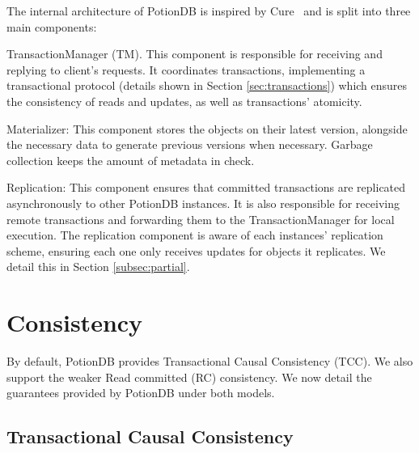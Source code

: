 \documentclass[sigconf, nonacm]{acmart}
\begin{document}
The internal architecture of PotionDB is inspired by Cure~\cite{cure} and is split into three main components:

\begin{compactitem}
	\item TransactionManager (TM). This component is responsible for receiving and replying to client's requests.
	It coordinates transactions, implementing a transactional protocol (details shown in Section \ref{sec:transactions}) which ensures the consistency of reads and updates, as well as transactions' atomicity.
	\item Materializer: This component stores the objects on their latest version, alongside the necessary data to generate previous versions when necessary.
	Garbage collection keeps the amount of metadata in check.
	\item Replication: This component ensures that committed transactions are replicated asynchronously to other PotionDB instances.
	It is also responsible for receiving remote transactions and forwarding them to the TransactionManager for local execution.
	The replication component is aware of each instances' replication scheme, ensuring each one only receives updates for objects it replicates. We detail this in Section \ref{subsec:partial}.
\end{compactitem}





\section{{Consistency}}
\label{sec:consistency}

By default, PotionDB provides Transactional Causal Consistency (TCC).
We also support the weaker Read committed (RC) consistency. %
We now detail the guarantees provided by PotionDB under both models.

\subsection{Transactional Causal Consistency}
\label{subsec:transactionalcausal}
\end{document}
